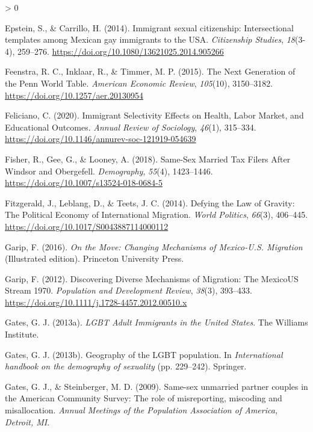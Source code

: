\documentclass[
  11pt,
]{article}
\newlength{\cslhangindent}
\newenvironment{CSLReferences}[2] %
 {%
  \setlength{\parindent}{0pt}
  \ifodd #1 \everypar{\setlength{\hangindent}{\cslhangindent}}\ignorespaces\fi
  \ifnum #2 > 0
  \setlength{\parskip}{#2\baselineskip}
  \fi
 }%
 {}
\begin{document}
\begin{CSLReferences}{1}{0}
\leavevmode\hypertarget{ref-epstein_2014}{}%
Epstein, S., \& Carrillo, H. (2014). Immigrant sexual citizenship: Intersectional templates among {Mexican} gay immigrants to the {USA}. \emph{Citizenship Studies}, \emph{18}(3-4), 259--276. \url{https://doi.org/10.1080/13621025.2014.905266}

\leavevmode\hypertarget{ref-feenstra_2015}{}%
Feenstra, R. C., Inklaar, R., \& Timmer, M. P. (2015). The {Next Generation} of the {Penn World Table}. \emph{American Economic Review}, \emph{105}(10), 3150--3182. \url{https://doi.org/10.1257/aer.20130954}

\leavevmode\hypertarget{ref-feliciano_2020}{}%
Feliciano, C. (2020). Immigrant {Selectivity Effects} on {Health}, {Labor Market}, and {Educational Outcomes}. \emph{Annual Review of Sociology}, \emph{46}(1), 315--334. \url{https://doi.org/10.1146/annurev-soc-121919-054639}

\leavevmode\hypertarget{ref-fisher_2018}{}%
Fisher, R., Gee, G., \& Looney, A. (2018). Same-{Sex Married Tax Filers After Windsor} and {Obergefell}. \emph{Demography}, \emph{55}(4), 1423--1446. \url{https://doi.org/10.1007/s13524-018-0684-5}

\leavevmode\hypertarget{ref-fitzgerald_2014}{}%
Fitzgerald, J., Leblang, D., \& Teets, J. C. (2014). Defying the {Law} of {Gravity}: {The Political Economy} of {International Migration}. \emph{World Politics}, \emph{66}(3), 406--445. \url{https://doi.org/10.1017/S0043887114000112}

\leavevmode\hypertarget{ref-garip_2016}{}%
Garip, F. (2016). \emph{On the {Move}: {Changing Mechanisms} of {Mexico}-{U}.{S}. {Migration}} (Illustrated edition). {Princeton University Press}.

\leavevmode\hypertarget{ref-garip_2012}{}%
Garip, F. (2012). Discovering {Diverse Mechanisms} of {Migration}: {The Mexico}{{US Stream}} 1970{}. \emph{Population and Development Review}, \emph{38}(3), 393--433. \url{https://doi.org/10.1111/j.1728-4457.2012.00510.x}

\leavevmode\hypertarget{ref-gates_2013}{}%
Gates, G. J. (2013a). \emph{{LGBT Adult Immigrants} in the {United States}}. {The Williams Institute}.

\leavevmode\hypertarget{ref-gates_2013a}{}%
Gates, G. J. (2013b). Geography of the {LGBT} population. In \emph{International handbook on the demography of sexuality} (pp. 229--242). {Springer}.

\leavevmode\hypertarget{ref-gates_2009}{}%
Gates, G. J., \& Steinberger, M. D. (2009). Same-sex unmarried partner couples in the {American Community Survey}: {The} role of misreporting, miscoding and misallocation. \emph{Annual Meetings of the Population Association of America, Detroit, {MI}}.


\end{CSLReferences}
\end{document}
